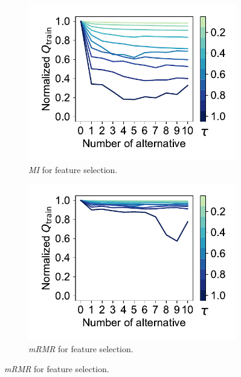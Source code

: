 \documentclass{article}
\theoremstyle{definition}
\begin{document}
\begin{figure}[t]
	\centering
	\begin{subfigure}[t]{0.48\textwidth}
		\centering
		\includegraphics[width=\textwidth, trim=15 17 10 15, clip]{plots/afs-impact-num-alternatives-tau-train-objective-max-mi.pdf}
		\caption{
			\emph{MI} for feature selection.
		}
		\label{fig:afs:impact-num-alternatives-tau-train-objective-max-mi}
	\end{subfigure}
	\hfill
	\begin{subfigure}[t]{0.48\textwidth}
		\centering
		\includegraphics[width=\textwidth, trim=15 17 10 15, clip]{plots/afs-impact-num-alternatives-tau-train-objective-max-mrmr.pdf}
		\caption{
			\emph{mRMR} for feature selection.
}
\end{subfigure}
\end{figure}
\end{document}
